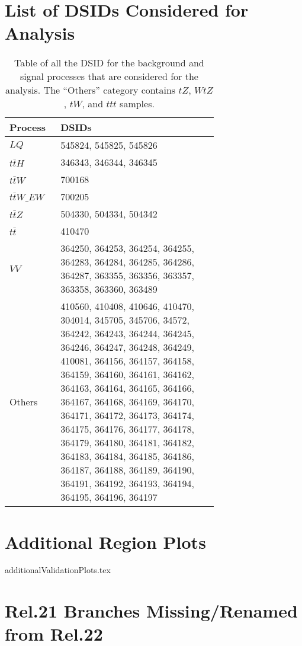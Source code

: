 \section{List of DSIDs Considered for Analysis}\label{DSIDs}
    \renewcommand{\arraystretch}{1.2}
    \begin{table}[h!]
        \centering
        \begin{tabular}{p{0.1\linewidth}|p{0.6\linewidth}}
            Process & DSIDs \\ \hline
            $LQ$        & 545824, 545825, 545826 \\ \hline
            $t\bar{t}H$ & 346343, 346344, 346345 \\ \hline
            $t\bar{t}W$ & 700168 \\ \hline
            $t\bar{t}W\_EW$ & 700205 \\ \hline
            $t\bar{t}Z$ & 504330, 504334, 504342 \\ \hline
            $t\bar{t}$  & 410470 \\ \hline 
            $VV$        & 364250, 364253, 364254, 364255, 364283, 364284, 364285, 364286, 364287, 363355, 363356, 363357, 363358, 363360, 363489 \\ \hline 
            Others      & 410560, 410408, 410646, 410470, 304014, 345705, 345706, 34572, 364242, 364243, 364244, 364245, 364246, 364247, 364248, 364249, 410081, 364156, 364157, 364158, 364159, 364160, 364161, 364162, 364163, 364164, 364165, 364166, 364167, 364168, 364169, 364170, 364171, 364172, 364173, 364174, 364175, 364176, 364177, 364178, 364179, 364180, 364181, 364182, 364183, 364184, 364185, 364186, 364187, 364188, 364189, 364190, 364191, 364192, 364193, 364194, 364195, 364196, 364197 \\[20pt]
        \end{tabular}
        \caption{Table of all the DSID for the background and signal processes that are considered for the analysis. The ``Others'' category contains $tZ$, $WtZ$, $tW$, and $ttt$ samples.}
        \label{signalAndBackgroundDSIDs}
    \end{table}
    \renewcommand{\arraystretch}{1}


\pagebreak
\section{Additional Region Plots}
    {additionalValidationPlots.tex}


\pagebreak
\section{Rel.21 Branches Missing/Renamed from Rel.22}\label{MissingBranches}
